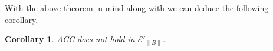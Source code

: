 \documentclass[12pt]{report}
\newtheorem{cor}[thm]{Corollary}
\theoremstyle{definition}
\begin{document}
With the above theorem in mind along with  we can deduce the following corollary. 
\begin{cor}
ACC does not hold in $\mathcal{E}'_{\lVert B \rVert}$.
\end{cor}


\end{document}
